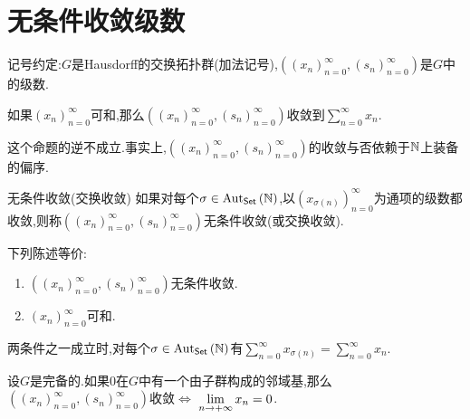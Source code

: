 \section{无条件收敛级数}

记号约定:$G$是Hausdorff的交换拓扑群(加法记号),$\left(\left(x_{n}\right)_{n=0}^{\infty},\left(s_{n}\right)_{n=0}^{\infty}\right)$是$G$中的级数.

\begin{proposition}{}{}
	如果$\left(x_{n}\right)_{n=0}^{\infty}$可和,那么$\left(\left(x_{n}\right)_{n=0}^{\infty},\left(s_{n}\right)_{n=0}^{\infty}\right)$收敛到$\sum\limits_{n=0}^{\infty}x_{n}$.
\end{proposition}

\begin{remark}{}{}
	这个命题的逆不成立.事实上,$\left(\left(x_{n}\right)_{n=0}^{\infty},\left(s_{n}\right)_{n=0}^{\infty}\right)$的收敛与否依赖于$\mathbb{N}$上装备的偏序.
\end{remark}

\begin{definition}{无条件收敛(交换收敛)}{}
	如果对每个$\sigma\in\operatorname{Aut}_{\mathsf{Set}}\left(\mathbb{N}\right)$,以$\left(x_{\sigma\left(n\right)}\right)_{n=0}^{\infty}$为通项的级数都收敛,则称$\left(\left(x_{n}\right)_{n=0}^{\infty},\left(s_{n}\right)_{n=0}^{\infty}\right)$无条件收敛(或交换收敛).
\end{definition}

\begin{proposition}{}{}
	下列陈述等价:
	\begin{enumerate}
		\item $\left(\left(x_{n}\right)_{n=0}^{\infty},\left(s_{n}\right)_{n=0}^{\infty}\right)$无条件收敛.
		\item $\left(x_{n}\right)_{n=0}^{\infty}$可和.
	\end{enumerate}
	两条件之一成立时,对每个$\sigma\in\operatorname{Aut}_{\mathsf{Set}}\left(\mathbb{N}\right)$有$\sum\limits_{n=0}^{\infty}x_{\sigma\left(n\right)}=\sum\limits_{n=0}^{\infty}x_{n}$.
\end{proposition}

\begin{remark}{}{}
	设$G$是完备的.如果$0$在$G$中有一个由子群构成的邻域基,那么$\left(\left(x_{n}\right)_{n=0}^{\infty},\left(s_{n}\right)_{n=0}^{\infty}\right)$收敛$\iff$ $\displaystyle\lim_{n\to+\infty}x_{n}=0$.
\end{remark}